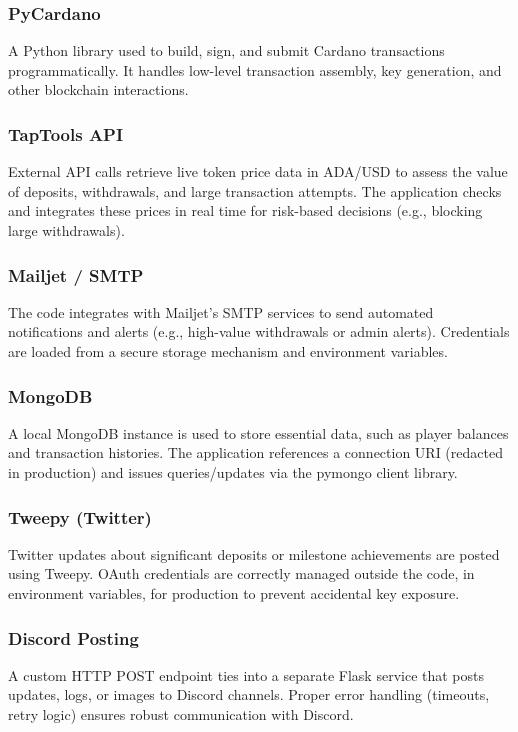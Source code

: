 \documentclass[11pt,a4paper]{article}
\begin{document}
\subsubsection{PyCardano}
A Python library used to build, sign, and submit Cardano transactions programmatically. It handles low-level transaction assembly, key generation, and other blockchain interactions.

\subsubsection{TapTools API}
External API calls retrieve live token price data in ADA/USD to assess the value of deposits, withdrawals, and large transaction attempts. The application checks and integrates these prices in real time for risk-based decisions (e.g., blocking large withdrawals).

\subsubsection{Mailjet / SMTP}
The code integrates with Mailjet's SMTP services to send automated notifications and alerts (e.g., high-value withdrawals or admin alerts). Credentials are loaded from a secure storage mechanism and environment variables.

\subsubsection{MongoDB}
A local MongoDB instance is used to store essential data, such as player balances and transaction histories. The application references a connection URI (redacted in production) and issues queries/updates via the pymongo client library.

\subsubsection{Tweepy (Twitter)}
Twitter updates about significant deposits or milestone achievements are posted using Tweepy. OAuth credentials are correctly managed outside the code, in environment variables, for production to prevent accidental key exposure.

\subsubsection{Discord Posting}
A custom HTTP POST endpoint ties into a separate Flask service that posts updates, logs, or images to Discord channels. Proper error handling (timeouts, retry logic) ensures robust communication with Discord.
\end{document}
